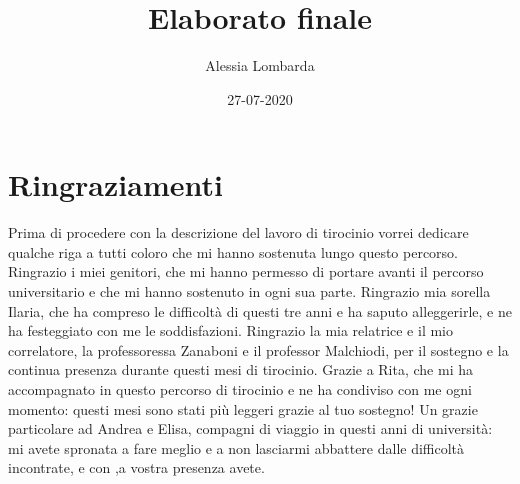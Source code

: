 \documentclass[oneside, openany]{book}
\title{Elaborato finale}
\date{27-07-2020}
\author{Alessia Lombarda}
\begin{document}
	\begin{titlepage}
		
	\end{titlepage}
	\frontmatter
	\chapter*{Ringraziamenti}
	Prima di procedere con la descrizione del lavoro di tirocinio vorrei dedicare qualche riga a tutti coloro che mi hanno sostenuta lungo questo percorso.
	Ringrazio i miei genitori, che mi hanno permesso di portare avanti il percorso universitario e che mi hanno sostenuto in ogni sua parte. Ringrazio mia sorella Ilaria, che ha compreso le difficoltà di questi tre anni e ha saputo alleggerirle, e ne ha festeggiato con me le soddisfazioni.
	Ringrazio la mia relatrice e il mio correlatore, la professoressa Zanaboni e il professor Malchiodi, per il sostegno e la continua presenza durante questi mesi di tirocinio.
	Grazie a Rita, che mi ha accompagnato in questo percorso di tirocinio e ne ha condiviso con me ogni momento: questi mesi sono stati più leggeri grazie al tuo sostegno!
	Un grazie particolare ad Andrea e Elisa, compagni di viaggio in questi anni di università: mi avete spronata a fare meglio e a non lasciarmi abbattere dalle difficoltà incontrate, e con ,a vostra presenza avete.
	\tableofcontents
	\mainmatter
\end{document}
